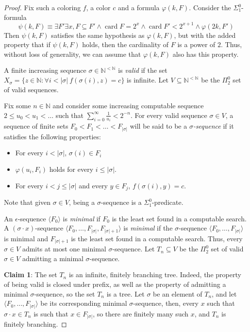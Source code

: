 \documentclass{article}
\numberwithin{theorem}{section}
\newcommand{\NN}[0]{\mathbb{N}}
\newcommand{\card}{\operatorname{card}}
\begin{document}
\begin{proof}
Fix such a coloring $f$, a color $c$ and a formula $\varphi(k,F)$. Consider the $\Sigma^0_1$-formula 
$$
\psi(k,F) \equiv \exists F' \exists x, F \subseteq F' \wedge \card F = 2^x \wedge \card F' < 2^{x+1} \wedge \varphi(2k,F')
$$
Then $\psi(k,F)$ satisfies the same hypothesis as $\varphi(k,F)$, but with the added property that if $\psi(k,F)$ holds, then the cardinality of $F$ is a power of $2$. Thus, without loss of generality, we can assume that $\varphi(k,F)$ also has this property. 

A finite increasing sequence $\sigma \in \NN^{<\NN}$ is \emph{valid} if the set $X_\sigma = \{ z \in \NN : \forall i < |\sigma|\ f(\sigma(i), z) = c \}$ is infinite. Let $V \subseteq \NN^{<\NN}$ be the $\Pi^0_2$ set of valid sequences.

Fix some $n \in \NN$ and consider some increasing computable sequence $2 \leq u_0 < u_1 < \dots$ such that $\sum_{i = 0}^{\infty} \frac{1}{u_i} < 2^{-n}$. 
For every valid sequence $\sigma \in V$, a sequence of finite sets $F_0 < F_1 < \dots < F_{|\sigma|}$ will be said to be a \emph{$\sigma$-sequence} if it satisfies the following properties:
\begin{itemize}
    \item For every $i < |\sigma|$, $\sigma(i) \in F_i$ 
    \item $\varphi(u_i,F_i)$ holds for every $i \leq |\sigma|$.
    \item For every $i < j \leq |\sigma|$ and every $y \in F_j$, $f(\sigma(i),y) = c$.
\end{itemize}
Note that given $\sigma \in V$, being a $\sigma$-sequence is a $\Sigma^0_1$-predicate.

An $\epsilon$-sequence $\langle F_0 \rangle$ is \emph{minimal} if $F_0$ is the least set found in a computable search. A $(\sigma \cdot x)$-sequence $\langle F_0, \dots, F_{|\sigma|}, F_{|\sigma|+1}\rangle$  is \emph{minimal} if the $\sigma$-sequence $\langle F_0, \dots, F_{|\sigma|}\rangle$ is minimal and $F_{|\sigma|+1}$ is the least set found in a computable search. Thus, every $\sigma \in V$ admits at most one minimal $\sigma$-sequence. Let $T_n \subseteq V$ be the $\Pi^0_2$ set of valid~$\sigma \in V$ admitting a minimal $\sigma$-sequence.
\smallskip

\textbf{Claim 1}: The set $T_n$ is an infinite, finitely branching tree. Indeed, the property of being valid is closed under prefix, as well as the property of admitting a minimal $\sigma$-sequence, so the set $T_n$ is a tree. Let $\sigma$ be an element of $T_n$, and let $\langle F_0, \dots, F_{|\sigma|}\rangle$ be its corresponding minimal $\sigma$-sequence, then, every $x$ such that $\sigma \cdot x \in T_n$ is such that $x \in F_{|\sigma|}$, so there are finitely many such $x$, and $T_n$ is finitely branching.


\end{proof}
\end{document}
